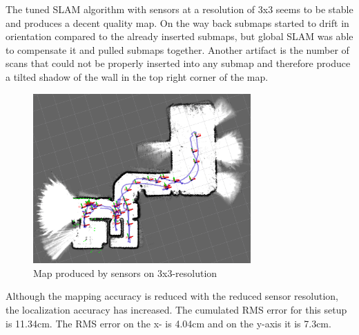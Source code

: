 The tuned SLAM algorithm with sensors at a resolution of 3x3 seems to be stable and produces a
decent quality map. On the way back submaps started to drift in orientation compared to the
already inserted submaps, but global SLAM was able to compensate it and pulled submaps together.
Another artifact is the number of scans that could not be properly inserted into any submap and
therefore produce a tilted shadow of the wall in the top right corner of the map.

\begin{figure}[!h]
    \centering
	\includegraphics[height=65mm, keepaspectratio]{figures/03_map.png}
    \caption{Map produced by sensors on 3x3-resolution}
    \label{fig:03_map}
\end{figure}

Although the mapping accuracy is reduced with the reduced sensor resolution, the localization
accuracy has increased. The cumulated RMS error for this setup is 11.34cm. The RMS error on the
x- is 4.04cm and on the y-axis it is 7.3cm.

